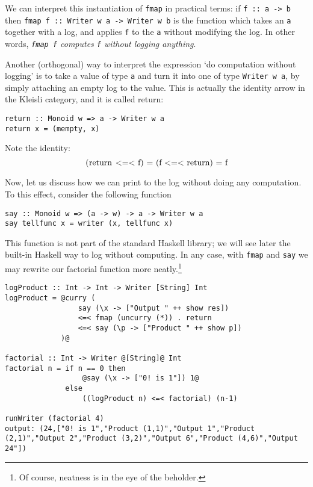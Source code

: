 \documentclass[11pt]{article}
\theoremstyle{nonumberplain}
\newcommand*\lsin{\lstinline}
\newcommand*\lsmath[1]{\text{\lstinline|#1|}}
\begin{document}
We can interpret this instantiation of \lsin|fmap| in practical terms: if \lsin|f :: a -> b| then \lsin|fmap f :: Writer w a -> Writer w b| is the function which takes an \lsin|a| together with a log, and applies \lsin|f| to the \lsin|a| without modifying the log. In other words, \emph{\lsin|fmap f| computes \lsin|f| without logging anything}.

\smallskip

Another (orthogonal) way to interpret the expression `do computation without logging' is to take a value of type \lsin|a| and turn it into one of type \lsin|Writer w a|, by simply attaching an empty log to the value. This is actually the identity arrow in the Kleisli category, and it is called return:
\begin{lstlisting}
return :: Monoid w => a -> Writer w a
return x = (mempty, x)
\end{lstlisting}

Note the identity:
\begin{equation}
\lsmath{(return <=< f) = (f <=< return) = f}
\end{equation}

\smallskip

Now, let us discuss how we can print to the log without doing any computation. To this effect, consider the following function
\begin{lstlisting}
say :: Monoid w => (a -> w) -> a -> Writer w a
say tellfunc x = writer (x, tellfunc x)
\end{lstlisting}

This function is not part of the standard Haskell library; we will see later the built-in Haskell way to log without computing. In any case, with \lsin|fmap| and \lsin|say| we may rewrite our factorial function more neatly.\footnote{Of course, neatness is in the eye of the beholder.}
\begin{lstlisting}
logProduct :: Int -> Int -> Writer [String] Int
logProduct = @curry (
                 say (\x -> ["Output " ++ show res])
                 <=< fmap (uncurry (*)) . return
                 <=< say (\p -> ["Product " ++ show p])
             )@

factorial :: Int -> Writer @[String]@ Int
factorial n = if n == 0 then
                  @say (\x -> ["0! is 1"]) 1@
              else
                  ((logProduct n) <=< factorial) (n-1)

runWriter (factorial 4)
output: (24,["0! is 1","Product (1,1)","Output 1","Product (2,1)","Output 2","Product (3,2)","Output 6","Product (4,6)","Output 24"])
\end{lstlisting}
\end{document}
